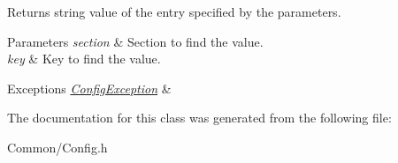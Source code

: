 Returns string value of the entry specified by the parameters. 


\begin{DoxyParams}{Parameters}
{\em section} & Section to find the value. \\
\hline
{\em key} & Key to find the value.\\
\hline
\end{DoxyParams}

\begin{DoxyExceptions}{Exceptions}
{\em \hyperlink{class_common_1_1_config_exception}{Config\-Exception}} & \\
\hline
\end{DoxyExceptions}


The documentation for this class was generated from the following file\-:\begin{DoxyCompactItemize}
\item 
Common/Config.\-h\end{DoxyCompactItemize}
